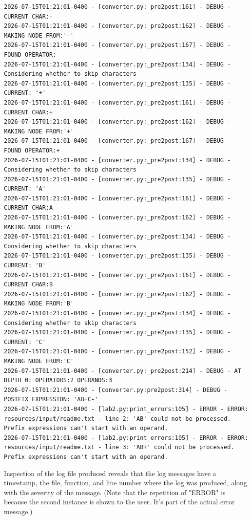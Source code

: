 \documentclass[10pt,letterpaper,final]{report}
\begin{document}
\begin{verbatim}
2026-07-15T01:21:01-0400 - [converter.py:_pre2post:161] - DEBUG - CURRENT CHAR:-
2026-07-15T01:21:01-0400 - [converter.py:_pre2post:162] - DEBUG - MAKING NODE FROM:'-'
2026-07-15T01:21:01-0400 - [converter.py:_pre2post:167] - DEBUG - FOUND OPERATOR:-
2026-07-15T01:21:01-0400 - [converter.py:_pre2post:134] - DEBUG - Considering whether to skip characters
2026-07-15T01:21:01-0400 - [converter.py:_pre2post:135] - DEBUG - CURRENT: '+'
2026-07-15T01:21:01-0400 - [converter.py:_pre2post:161] - DEBUG - CURRENT CHAR:+
2026-07-15T01:21:01-0400 - [converter.py:_pre2post:162] - DEBUG - MAKING NODE FROM:'+'
2026-07-15T01:21:01-0400 - [converter.py:_pre2post:167] - DEBUG - FOUND OPERATOR:+
2026-07-15T01:21:01-0400 - [converter.py:_pre2post:134] - DEBUG - Considering whether to skip characters
2026-07-15T01:21:01-0400 - [converter.py:_pre2post:135] - DEBUG - CURRENT: 'A'
2026-07-15T01:21:01-0400 - [converter.py:_pre2post:161] - DEBUG - CURRENT CHAR:A
2026-07-15T01:21:01-0400 - [converter.py:_pre2post:162] - DEBUG - MAKING NODE FROM:'A'
2026-07-15T01:21:01-0400 - [converter.py:_pre2post:134] - DEBUG - Considering whether to skip characters
2026-07-15T01:21:01-0400 - [converter.py:_pre2post:135] - DEBUG - CURRENT: 'B'
2026-07-15T01:21:01-0400 - [converter.py:_pre2post:161] - DEBUG - CURRENT CHAR:B
2026-07-15T01:21:01-0400 - [converter.py:_pre2post:162] - DEBUG - MAKING NODE FROM:'B'
2026-07-15T01:21:01-0400 - [converter.py:_pre2post:134] - DEBUG - Considering whether to skip characters
2026-07-15T01:21:01-0400 - [converter.py:_pre2post:135] - DEBUG - CURRENT: 'C'
2026-07-15T01:21:01-0400 - [converter.py:_pre2post:152] - DEBUG - MAKING NODE FROM:'C'
2026-07-15T01:21:01-0400 - [converter.py:_pre2post:214] - DEBUG - AT DEPTH 0: OPERATORS:2 OPERANDS:3
2026-07-15T01:21:01-0400 - [converter.py:pre2post:314] - DEBUG - POSTFIX EXPRESSION: 'AB+C-'
2026-07-15T01:21:01-0400 - [lab2.py:print_errors:105] - ERROR - ERROR: resources/input/readme.txt - line 2: 'AB' could not be processed. Prefix expressions can't start with an operand.
2026-07-15T01:21:01-0400 - [lab2.py:print_errors:105] - ERROR - ERROR: resources/input/readme.txt - line 3: 'AB+' could not be processed. Prefix expressions can't start with an operand.
\end{verbatim}

Inspection of the log file produced reveals that the log messages have a timestamp, the file, function, and line number where the log was produced, along with the severity of the message. (Note that the repetition of "ERROR" is because the second instance is shown to the user. It's part of the actual error message.)
\end{document}
